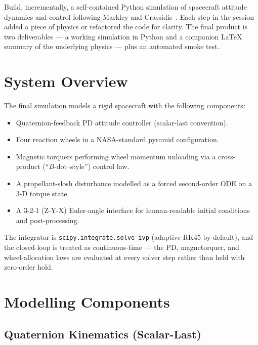 Build, incrementally, a self-contained Python simulation of spacecraft
attitude dynamics and control following Markley and
Crassidis~\cite{markley2014}. Each step in the session added a piece of
physics or refactored the code for clarity. The final product is two
deliverables --- a working simulation in Python and a companion
LaTeX summary of the underlying physics --- plus an automated smoke test.


\section{System Overview}

The final simulation models a rigid spacecraft with the following
components:

\begin{itemize}\setlength{\itemsep}{2pt}
  \item Quaternion-feedback PD attitude controller (scalar-last convention).
  \item Four reaction wheels in a NASA-standard pyramid configuration.
  \item Magnetic torquers performing wheel momentum unloading via a
        cross-product (``\(B\)-dot--style'') control law.
  \item A propellant-slosh disturbance modelled as a forced second-order
        ODE on a 3-D torque state.
  \item A 3-2-1 (Z-Y-X) Euler-angle interface for human-readable initial
        conditions and post-processing.
\end{itemize}

\noindent The integrator is \texttt{scipy.integrate.solve\_ivp} (adaptive
RK45 by default), and the closed-loop is treated as continuous-time --- the
PD, magnetorquer, and wheel-allocation laws are evaluated at every solver
step rather than held with zero-order hold.


\section{Modelling Components}

\subsection{Quaternion Kinematics (Scalar-Last)}

